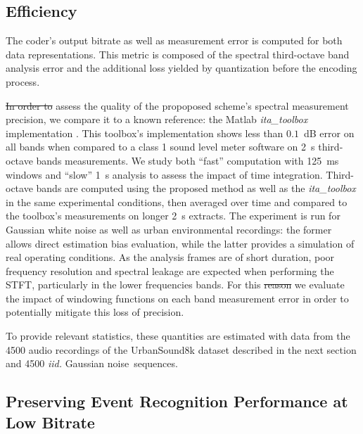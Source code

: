 \documentclass[sensors,article,accept,moreauthors,pdftex,10pt,a4paper]{mdpi}
\providecommand{\DIFaddtex}[1]{{\protect\color{blue}\uwave{#1}}} %
\providecommand{\DIFdeltex}[1]{{\protect\color{red}\sout{#1}}}                      %
\providecommand{\DIFaddbegin}{} %
\providecommand{\DIFaddend}{} %
\providecommand{\DIFdelbegin}{} %
\providecommand{\DIFdelend}{} %
\providecommand{\DIFadd}[1]{\texorpdfstring{\DIFaddtex{#1}}{#1}} %
\providecommand{\DIFdel}[1]{\texorpdfstring{\DIFdeltex{#1}}{}} %
\begin{document}
\subsection{Efficiency} \label{sec:efficiency_p}

The coder's output bitrate as well as measurement error is computed for both data representations. This metric is composed of the spectral third-octave band analysis error and the additional loss yielded by quantization before the encoding process.

\DIFdelbegin \DIFdel{In order to }\DIFdelend \DIFaddbegin {\DIFadd{To}} \DIFaddend assess the quality of the propoposed scheme's spectral measurement precision, we compare it to a known reference: the Matlab \textit{ita\_toolbox} implementation \cite{itatoolbox2017}. This toolbox's implementation shows less than $0.1$~dB error on all bands when compared to a class 1 sound level meter software on 2~s third-octave bands measurements. We study both ``fast'' computation with 125~ms windows and ``slow'' 1~s analysis to assess the impact of time integration. Third-octave bands are computed using the proposed method as well as the \textit{ita\_toolbox} in the same experimental conditions, then averaged over time and compared to the toolbox's measurements on longer 2~s extracts. The experiment is run for Gaussian white noise as well as urban environmental recordings: the former allows direct estimation bias evaluation, while the latter provides a simulation of real operating conditions. As the analysis frames are of short duration, poor frequency resolution and spectral leakage are expected when performing the STFT, particularly in the lower frequencies bands. For this \DIFdelbegin \DIFdel{reason }\DIFdelend \DIFaddbegin {\DIFadd{reason,}} \DIFaddend we evaluate the impact of windowing functions on each band measurement error in order to potentially mitigate this loss of precision.

To provide relevant statistics, these quantities are estimated with data from the 4500 audio recordings of the UrbanSound8k dataset \cite{salamon2014} described in the next section and 4500 \textit{iid.} Gaussian \mbox{noise sequences.}

\subsection{Preserving Event Recognition Performance at Low Bitrate} \label{sec:event_p}
\end{document}
